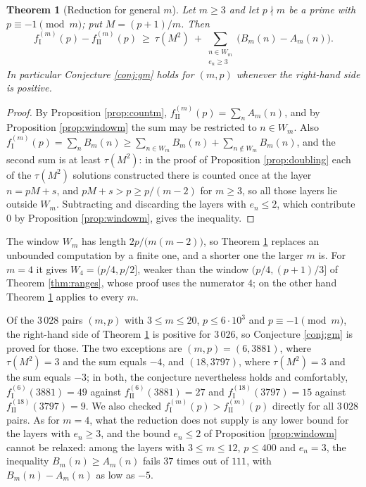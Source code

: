 \documentclass[11pt,reqno]{amsart}
\theoremstyle{plain}
\newtheorem{theorem}{Theorem}[section]
\theoremstyle{definition}
\numberwithin{equation}{section}
\newcommand{\fI}{f_{\mathrm{I}}}
\newcommand{\fII}{f_{\mathrm{II}}}
\begin{document}
\begin{theorem}[Reduction for general $m$]\label{thm:redm}
Let $m\ge3$ and let $p\nmid m$ be a prime with $p\equiv-1\pmod m$; put $M=(p+1)/m$.
Then
\[
  \fI^{(m)}(p)-\fII^{(m)}(p)\ \ge\ \tau(M^{2})\ +\!\!
  \sum_{\substack{n\in W_{m}\\ e_{n}\ge3}}\!\!\bigl(B_{m}(n)-A_{m}(n)\bigr).
\]
In particular Conjecture \ref{conj:gm} holds for $(m,p)$ whenever the right-hand side
is positive.
\end{theorem}

\begin{proof}
By Proposition \ref{prop:countm}, $\fII^{(m)}(p)=\sum_{n}A_{m}(n)$, and by Proposition
\ref{prop:windowm} the sum may be restricted to $n\in W_{m}$. Also
$\fI^{(m)}(p)=\sum_{n}B_{m}(n)\ge\sum_{n\in W_{m}}B_{m}(n)+\sum_{n\notin W_{m}}B_{m}(n)$,
and the second sum is at least $\tau(M^{2})$: in the proof of Proposition
\ref{prop:doubling} each of the $\tau(M^{2})$ solutions constructed there is counted
once at the layer $n=pM+s$, and $pM+s>p\ge p/(m-2)$ for $m\ge3$, so all those layers
lie outside $W_{m}$. Subtracting and discarding the layers with $e_{n}\le2$, which
contribute $0$ by Proposition \ref{prop:windowm}, gives the inequality.
\end{proof}

The window $W_{m}$ has length $2p/\bigl(m(m-2)\bigr)$, so Theorem \ref{thm:redm}
replaces an unbounded computation by a finite one, and a shorter one the larger $m$ is.
For $m=4$ it gives $W_{4}=(p/4,p/2]$, weaker than the window $(p/4,(p+1)/3]$ of
Theorem \ref{thm:ranges}, whose proof uses the numerator $4$; on the other hand
Theorem \ref{thm:redm} applies to every $m$.

Of the $3\,028$ pairs $(m,p)$ with $3\le m\le20$, $p\le6\cdot10^{3}$ and
$p\equiv-1\pmod m$, the right-hand side of Theorem \ref{thm:redm} is positive for
$3\,026$, so Conjecture \ref{conj:gm} is proved for those. The two exceptions are
$(m,p)=(6,3881)$, where $\tau(M^{2})=3$ and the sum equals $-4$, and $(18,3797)$, where
$\tau(M^{2})=3$ and the sum equals $-3$; in both, the conjecture nevertheless holds and
comfortably, $\fI^{(6)}(3881)=49$ against $\fII^{(6)}(3881)=27$ and
$\fI^{(18)}(3797)=15$ against $\fII^{(18)}(3797)=9$. We also checked
$\fI^{(m)}(p)>\fII^{(m)}(p)$ directly for all $3\,028$ pairs. As for $m=4$, what the reduction does
not supply is any lower bound for the layers with $e_{n}\ge3$, and the bound
$e_{n}\le2$ of Proposition \ref{prop:windowm} cannot be relaxed: among the layers with
$3\le m\le12$, $p\le400$ and $e_{n}=3$, the inequality $B_{m}(n)\ge A_{m}(n)$ fails
$37$ times out of $111$, with $B_{m}(n)-A_{m}(n)$ as low as $-5$.
\end{document}
